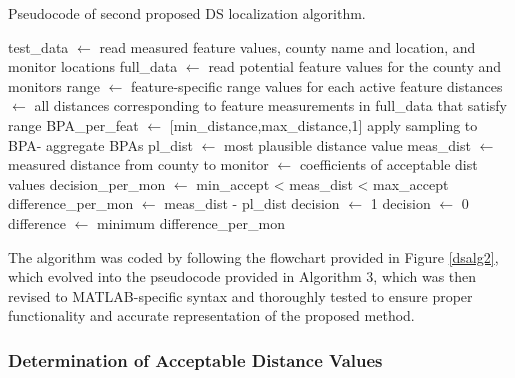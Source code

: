\documentclass[12pt]{uthesis-v12}  %
\begin{document}
\begin{algorithm}
\caption{Pseudocode of second proposed DS localization algorithm.} \label{alg}
\begin{algorithmic}[1]
\STATE test\_data $\leftarrow$ read measured feature values, county name and location, and monitor locations
\STATE full\_data $\leftarrow$ read potential feature values for the county and monitors
\STATE range $\leftarrow$ feature-specific range values for each active feature
		\STATE distances $\leftarrow$ all distances corresponding to feature measurements in full\_data that satisfy range
		\STATE BPA\_per\_feat $\leftarrow$ [min\_distance,max\_distance,1]
		\STATE apply sampling to BPA-
	\ENDFOR
	\STATE aggregate BPAs
	\STATE pl\_dist $\leftarrow$ most plausible distance value
	\STATE meas\_dist $\leftarrow$ measured distance from county to monitor
	 $\leftarrow$ coefficients of acceptable dist values
	\STATE decision\_per\_mon $\leftarrow$ min\_accept < meas\_dist < max\_accept
	\STATE difference\_per\_mon $\leftarrow$ meas\_dist - pl\_dist
\ENDFOR
{}
	\STATE decision $\leftarrow$ 1
\ELSE
	\STATE decision $\leftarrow$ 0
\ENDIF
\STATE difference $\leftarrow$ minimum difference\_per\_mon

\label{dst}
\end{algorithmic}
\end{algorithm}

The algorithm was coded by following the flowchart provided in Figure \ref{dsalg2}, which evolved into the pseudocode provided in Algorithm 3, which was then revised to MATLAB-specific syntax and thoroughly tested to ensure proper functionality and accurate representation of the proposed method.

\subsubsection{Determination of Acceptable Distance Values}
\end{document}

